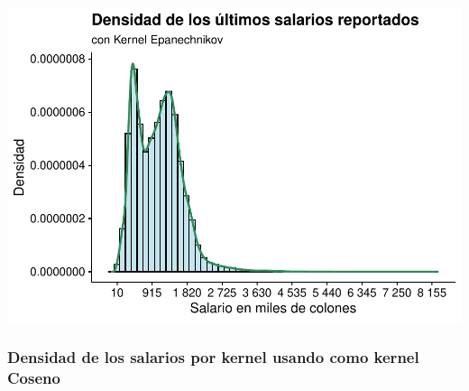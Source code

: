 \documentclass[
]{article}
\begin{document}
\includegraphics{mientras_files/figure-latex/unnamed-chunk-15-1.pdf}

\hypertarget{densidad-de-los-salarios-por-kernel-usando-como-kernel-coseno}{%
\subsubsection{Densidad de los salarios por kernel usando como kernel
Coseno}\label{densidad-de-los-salarios-por-kernel-usando-como-kernel-coseno}}
\end{document}
